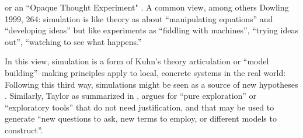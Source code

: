 
\parencite[31]{Winsberg2010} or an ``Opaque Thought Experiment" \parencite{DiPaolo2000}. A common view, among others Dowling 1999, 264: simulation is like theory as about ``manipulating equations'' and ``developing ideas'' but like experiments as ``fiddling with machines'', ``trying ideas out'', ``watching to see what happens.'' 

In this view, simulation is a form of Kuhn's theory articulation or ``model building''--making principles apply to local, concrete systems in the real world:  Following this third way, simulations might be seen as a source of new hypotheses \parencite{Eldridge}. Similarly, Taylor as summarized in \parencite{Webb2009}, argues for ``pure exploration'' or ``exploratory tools'' that do not need justification, and that may be used to generate ``new questions to ask, new terms to employ, or different models to construct''.


